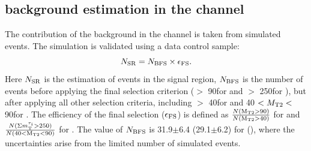\subsection{\texorpdfstring{\wjets background estimation in the \tauTau channel}{W+jets background estimation in the tau-tau channel}}
\label{sect:bkgW}
The contribution of the \wjets background in the \tauTau channel is taken from simulated events. The simulation is validated using a data control sample: 
\begin{equation}
N_{\rm SR} = N_{\rm BFS} \times \epsilon_{\rm{FS}}.
\end{equation}
Here $N_{\rm SR}$ is the estimation of \wjets events in the signal region, $N_{\rm BFS}$ is the number of 
\wjets events before applying the final selection criterion (\mttwo $>$ 90\GeV for \binone and \SumMT $>$ 250\GeV for \bintwo), but after applying all other selection criteria, including \mttwo $>$ 40\GeV for \binone and 40 $<{M_{\rm T2}}<$ 90\GeV for \bintwo.
The efficiency of the final selection ($\epsilon_{\rm{FS}}$) is defined as $\frac{N (\rm M_{T2}>90)}{N (\rm M_{T2}>40)}$ for \binone and $\frac{N (\Sigma m_{\rm T}^{\tau_i}>250)}{N(40<\rm M_{T2}<90)}$ for \bintwo.
The value of $N_{\rm BFS}$ is 31.9$\pm$6.4 (29.1$\pm$6.2) for \binone (\bintwo), where the uncertainties arise from the limited number of simulated events. 


